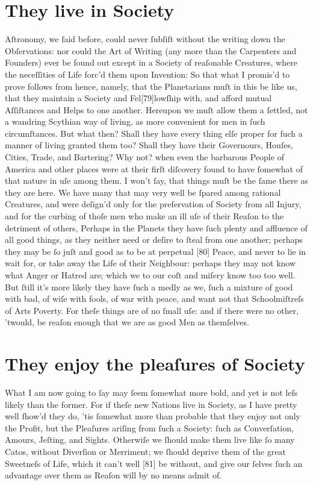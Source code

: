 \documentclass[letterpaper]{book}
\begin{document}
\section{They live in Society}

Aſtronomy, we ſaid before, could never ſubſiſt without the writing down the
Obſervations: nor could the Art of Writing (any more than the Carpenters and
Founders) ever be found out except in a Society of reaſonable Creatures,
where the neceſſities of Life forc'd them upon Invention: So that what I
promis'd to prove follows from hence, namely, that the Planetarians muſt in
this be like us, that they maintain a Society and Fel[79]lowſhip with, and
afford mutual Aſſiſtances and Helps to one another. Hereupon we muſt allow
them a ſettled, not a wandring Scythian way of living, as more convenient
for men in ſuch circumſtances. But what then? Shall they have every thing
elſe proper for ſuch a manner of living granted them too? Shall they have
their Governours, Houſes, Cities, Trade, and Bartering? Why not? when even
the barbarous People of America and other places were at their firſt
diſcovery found to have ſomewhat of that nature in uſe among them. I won't
ſay, that things muſt be the ſame there as they are here.  We have many that
may very well be ſpared among rational Creatures, and were deſign'd only for
the preſervation of Society from all Injury, and for the curbing of thoſe
men who make an ill uſe of their Reaſon to the detriment of others, Perhaps
in the Planets they have ſuch plenty and affluence of all good things, as
they neither need or deſire to ſteal from one another; perhaps they may be
ſo juſt and good as to be at perpetual [80] Peace, and never to lie in wait
for, or take away the Life of their Neighbour: perhaps they may not know
what Anger or Hatred are; which we to our coſt and miſery know too too well.
But ſtill it's more likely they have ſuch a medly as we, ſuch a mixture of
good with bad, of wiſe with fools, of war with peace, and want not that
Schoolmiſtreſs of Arts Poverty. For theſe things are of no ſmall uſe: and if
there were no other, 'twould, be reaſon enough that we are as good Men as
themſelves.



\section{They enjoy the pleaſures of Society}

What I am now going to ſay may ſeem ſomewhat more bold, and yet is
not leſs likely than the former. For if theſe new Nations live in Society,
as I have pretty well ſhow'd they do, 'tis ſomewhat more than probable
that they enjoy not only the Profit, but the Pleaſures ariſing from ſuch a
Society: ſuch as Converſation, Amours, Jeſting, and Sights. Otherwiſe we
ſhould make them live like ſo many Catos, without Diverſion or Merriment;
we ſhould deprive them of the great Sweetneſs of Life, which it can't well
[81] be without, and give our ſelves ſuch an advantage over them as Reaſon
will by no means admit of.
\end{document}
